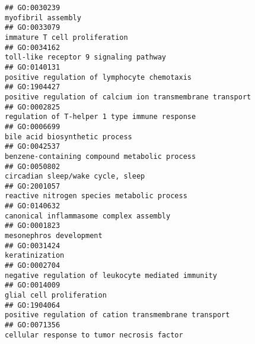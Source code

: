\documentclass[
]{article}
\begin{document}
\begin{verbatim}
## GO:0030239                                                                                                                               myofibril assembly
## GO:0033079                                                                                                                    immature T cell proliferation
## GO:0034162                                                                                                           toll-like receptor 9 signaling pathway
## GO:0140131                                                                                                     positive regulation of lymphocyte chemotaxis
## GO:1904427                                                                                       positive regulation of calcium ion transmembrane transport
## GO:0002825                                                                                                    regulation of T-helper 1 type immune response
## GO:0006699                                                                                                                   bile acid biosynthetic process
## GO:0042537                                                                                                    benzene-containing compound metabolic process
## GO:0050802                                                                                                                circadian sleep/wake cycle, sleep
## GO:2001057                                                                                                      reactive nitrogen species metabolic process
## GO:0140632                                                                                                          canonical inflammasome complex assembly
## GO:0001823                                                                                                                          mesonephros development
## GO:0031424                                                                                                                                   keratinization
## GO:0002704                                                                                               negative regulation of leukocyte mediated immunity
## GO:0014009                                                                                                                         glial cell proliferation
## GO:1904064                                                                                            positive regulation of cation transmembrane transport
## GO:0071356                                                                                                       cellular response to tumor necrosis factor

\end{verbatim}
\end{document}
